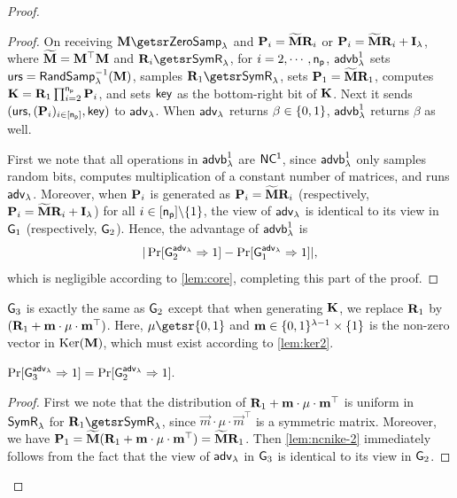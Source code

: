 \begin{proof}
\begin{proof}
On receiving $\matr M\getsr\zs$ and $\mathbf{{P}}_i=\widetilde{\mathbf{{M}}}{\mathbf{{R}}}_i$ or $\mathbf{{P}}_i=\widetilde{\mathbf{{M}}}{\mathbf{{R}}}_i+{\mathbf{{I}}}_{\lambda}$, where $\widetilde{\mathbf{{M}}}=\mathbf{{M}}^\top\mathbf{{M}}$ and $\sR_i\getsr\sr$, for $i=2,\cdots,\mathsf{n_p}$, $\mathsf{advb}_{\lambda}^1$ sets $\mathsf{urs}={\mathsf{RandSamp}}_\lambda^{-1}(\mathbf{{M}})$, samples $\sR_1\getsr\sr$, sets $\mathbf{{P}}_1=\widetilde{\mathbf{{M}}}{\mathbf{{R}}}_1$, computes $\mathbf{{K}}={\mathbf{{R}}}_1\prod_{i=2}^{\mathsf{n_p}}\mathbf{{P}}_i$, and sets $\mathsf{key}$ as the bottom-right bit of $\mathbf{{K}}$. Next it sends $(\mathsf{urs},\allowbreak(\mathbf{{P}}_i)_{i\in[\mathsf{n_p}]},\allowbreak\mathsf{key})$ to ${\mathsf{adv}}_\lambda$. When ${\mathsf{adv}}_\lambda$ returns $\beta\in\{0, 1\}$, $\mathsf{advb}_{\lambda}^1$ returns $\beta$ as well.

First we note that all operations in $\mathsf{advb}_{\lambda}^1$ are $\mathsf{NC^1}$, since $\mathsf{advb}_{\lambda}^1$ only samples random bits, computes multiplication of a constant number of matrices, and runs ${\mathsf{adv}}_\lambda$.
Moreover, when $\mathbf{{P}}_i$ is generated as $\mathbf{{P}}_i=\widetilde{\mathbf{{M}}}{\mathbf{{R}}}_i$ (respectively, $\mathbf{{P}}_i=\widetilde{\mathbf{{M}}}{\mathbf{{R}}}_i+{\mathbf{{I}}}_{\lambda}$) for all $i\in[\mathsf{n_p}]\backslash\{1\}$, the view of ${\mathsf{adv}}_\lambda$ is identical to its view in $\mathsf{G}_1$ (respectively, $\mathsf{G}_2$). Hence, the advantage of $\mathsf{advb}_{\lambda}^1$ is 
 $$
 |\Pr[\mathsf{G}_2^{{\mathsf{adv}}_\lambda}\Rightarrow 1]-\Pr[\mathsf{G}_1^{{\mathsf{adv}}_\lambda}\Rightarrow 1]|
 ,$$
 which is negligible according to \cref{lem:core},
completing this part of the proof.
 \end{proof}
 
  $\mathsf{G}_3$ is exactly the same as $\mathsf{G}_2$ except that when generating $\mathbf{{K}}$, we replace ${\mathbf{{R}}}_1$ by $({\mathbf{{R}}}_1+\mathbf{m}\cdot \mu \cdot \mathbf{m}^\top)$. Here, $\mu\getsr\bin$ and $\mathbf{m}\in\{0, 1\}^{\lambda-1}\times\{1\}$ is the non-zero vector in $\operatorname{Ker}(\mathbf{{M}})$, which must exist according to \cref{lem:ker2}.
\begin{lemma}
\label{lem:ncnike-2}
$
\Pr[\mathsf{G}_3^{{\mathsf{adv}}_\lambda}\Rightarrow 1]=\Pr[\mathsf{G}_2^{{\mathsf{adv}}_\lambda}\Rightarrow 1].
$
\end{lemma}
\begin{proof}
First we note that the distribution of ${\mathbf{{R}}}_1+\mathbf{m}\cdot\mu\cdot\mathbf{m}^\top$ is uniform in ${\mathsf{SymR}}_\lambda$ for $\sR_1\getsr\sr$, since $\vec m\cdot\mu\cdot\vec m^\top$ is a symmetric matrix. Moreover, we have $\mathbf{{P}}_1=\widetilde{\mathbf{{M}}}({\mathbf{{R}}}_1+\mathbf{m}\cdot\mu\cdot\mathbf{m}^\top)=\widetilde{\mathbf{{M}}}{\mathbf{{R}}}_1$. Then \cref{lem:ncnike-2} immediately follows from the fact that the view of ${\mathsf{adv}}_\lambda$ in $\mathsf{G}_3$ is identical to its view in $\mathsf{G}_2$.
\end{proof}


\end{proof}
